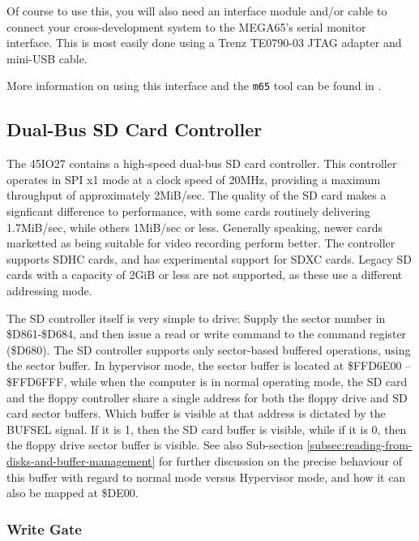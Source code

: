 Of course to use this, you will also need an interface module and/or
cable to connect your cross-development system to the MEGA65's serial
monitor interface. This is most easily done using a Trenz TE0790-03
JTAG adapter and mini-USB cable.

More information on using this interface and the {\tt m65} tool can be
found in .

\subsection{Dual-Bus SD Card Controller}

The 45IO27 contains a high-speed dual-bus SD card controller.  This
controller operates in SPI x1 mode at a clock speed of 20MHz,
providing a maximum throughput of approximately 2MiB/sec.  The quality
of the SD card makes a signficant difference to performance, with some
cards routinely delivering 1.7MiB/sec, while others 1MiB/sec or
less. Generally speaking, newer cards marketted as being suitable for
video recording perform better.  The controller supports SDHC cards,
and has experimental support for SDXC cards.  Legacy SD cards with a
capacity of 2GiB or less are not supported, as these use a different
addressing mode.

The SD controller itself is very simple to drive: Supply the sector
number in \$D861-\$D684, and then issue a read or write command to the
command register (\$D680).  The SD controller supports only
sector-based buffered operations, using the sector buffer. In
hypervisor mode, the sector buffer is located at \$FFD6E00 --
\$FFD6FFF, while when the computer is in normal operating mode, the SD
card and the floppy controller share a single address for both the
floppy drive and SD card sector buffers. Which buffer is visible at
that address is dictated by the BUFSEL signal. If it is 1, then the SD
card buffer is visible, while if it is 0, then the floppy drive sector
buffer is visible.  See also Sub-section
\vref{subsec:reading-from-disks-and-buffer-management} for further
discussion on the precise behaviour of this buffer with regard to
normal mode versus Hypervisor mode, and how it can also be mapped at
\$DE00. 

\subsubsection{Write Gate}

